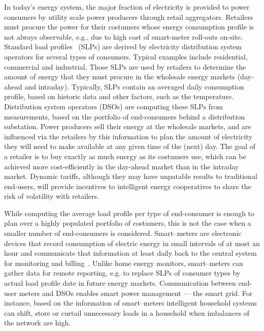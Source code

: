 \documentclass[conference]{IEEEtran}
\begin{document}
In today's energy system, the major fraction of electricity is provided to power consumers by utility scale power producers through retail aggregators. Retailers must procure the power for their costumers whose energy consumption profile is not always observable, e.g., due to high cost of smart-meter roll-outs on-site. Standard load profiles~\cite{jardini2000daily} (SLPs) are derived by electricity distribution system operators for several types of consumers. Typical examples include residential, commercial and industrial. Those SLPs are used by retailers to determine the amount of energy that they must procure in the wholesale energy markets (day-ahead and intraday). Typically, SLPs contain an averaged daily consumption profile, based on historic data and other factors, such as the temperature. Distribution system operators (DSOs) are computing these SLPs from measurements, based on the portfolio of end-consumers behind a distribution substation. Power producers sell their energy at the wholesale markets, and are influenced via the retailers by this information to plan the amount of electricity they will need to make available at any given time of the (next) day. The goal of a retailer is to buy exactly as much energy as its costumers use, which can be achieved more cost-efficiently in the day-ahead market than in the intraday market. Dynamic tariffs, although they may have unpatable results to traditional end-users, will provide incentives to intelligent energy cooperatives to share the risk of volatility with retailers.

While computing the average load profile per type of end-consumer is enough to plan over a highly populated portfolio of costumers, this is not the case when a smaller number of end-consumers is considered. Smart--meters are electronic devices that record consumption of electric energy in small intervals of at most an hour and communicate that information at least daily back to the central system for monitoring and billing~\cite{depuru2011smart}. Unlike home energy monitors, smart--meters can gather data for remote reporting, e.g. to replace SLPs of consumer types by actual load profile date in future energy markets. Communication between end-user meters and DSOs enables smart power management --- the smart grid. For instance, based on the information of smart--meters intelligent household systems can shift, store or curtail unnecessary loads in a household when imbalances of the network are high.
\end{document}
